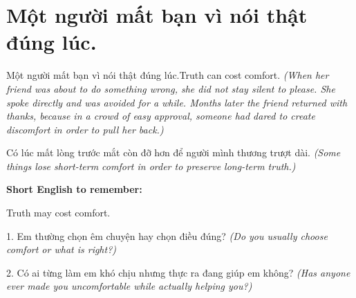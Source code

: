 \section{Một người mất bạn vì nói thật đúng lúc.}
\begin{truyen}{Một người mất bạn vì nói thật đúng lúc.}{Truth can cost comfort.}
\textit{(When her friend was about to do something wrong, she did not stay silent to please. She spoke directly and was avoided for a while. Months later the friend returned with thanks, because in a crowd of easy approval, someone had dared to create discomfort in order to pull her back.)}
\end{truyen}
\begin{baihoc}
Có lúc mất lòng trước mắt còn đỡ hơn để người mình thương trượt dài.
\textit{(Some things lose short-term comfort in order to preserve long-term truth.)}
\end{baihoc}
\begin{ghinhoanh}
\textbf{Short English to remember:}

Truth may cost comfort.
\end{ghinhoanh}
\begin{tuhocnhanh}
1. Em thường chọn êm chuyện hay chọn điều đúng? \textit{(Do you usually choose comfort or what is right?)}

2. Có ai từng làm em khó chịu nhưng thực ra đang giúp em không? \textit{(Has anyone ever made you uncomfortable while actually helping you?)}
\end{tuhocnhanh}
\ngancach

